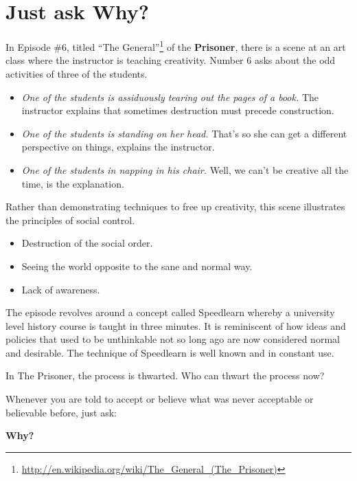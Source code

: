 \section{Just ask Why?}

In Episode
\#6, titled ``The General''\footnote{\url{http://en.wikipedia.org/wiki/The\_General\_(The\_Prisoner)}} of the \textbf{Prisoner}, there is a scene at an art class where the instructor is teaching creativity. Number 6 asks about the odd activities of three of the students.

\begin{itemize}


\item \emph{One of the students is assiduously tearing out the pages of a book.} The instructor explains that sometimes destruction must precede construction.

\item \emph{One of the students is standing on her head.} That's so she can get a different perspective on things, explains the instructor.

\item \emph{One of the students in napping in his chair.} Well, we can't be creative all the time, is the explanation.
\end{itemize}


Rather than demonstrating techniques to free up creativity, this scene illustrates the principles of social control.

\begin{itemize}


\item Destruction of the social order.

\item Seeing the world opposite to the sane and normal way.

\item Lack of awareness.
\end{itemize}


The episode revolves around a concept called Speedlearn whereby a university level history course is taught in three minutes. It is reminiscent of how ideas and policies that used to be unthinkable not so long ago are now considered normal and desirable. The technique of Speedlearn is well known and in constant use.

In The Prisoner, the process is thwarted. Who can thwart the process now?

Whenever you are told to accept or believe what was never acceptable or believable before, just ask:

\textbf{Why?}



